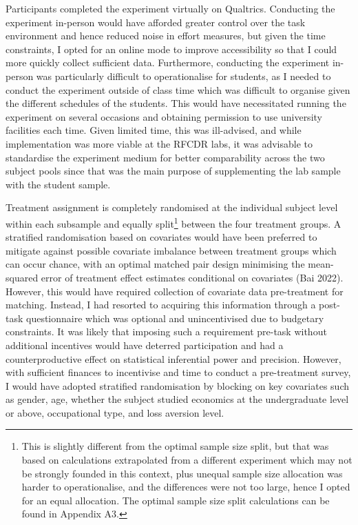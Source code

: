 \documentclass[
  12,
  letterpaper,
  DIV=11,
  numbers=noendperiod]{scrartcl}
\begin{document}
Participants completed the experiment virtually on Qualtrics. Conducting
the experiment in-person would have afforded greater control over the
task environment and hence reduced noise in effort measures, but given
the time constraints, I opted for an online mode to improve
accessibility so that I could more quickly collect sufficient data.
Furthermore, conducting the experiment in-person was particularly
difficult to operationalise for students, as I needed to conduct the
experiment outside of class time which was difficult to organise given
the different schedules of the students. This would have necessitated
running the experiment on several occasions and obtaining permission to
use university facilities each time. Given limited time, this was
ill-advised, and while implementation was more viable at the RFCDR labs,
it was advisable to standardise the experiment medium for better
comparability across the two subject pools since that was the main
purpose of supplementing the lab sample with the student sample.

Treatment assignment is completely randomised at the individual subject
level within each subsample and equally split\footnote{This is slightly
  different from the optimal sample size split, but that was based on
  calculations extrapolated from a different experiment which may not be
  strongly founded in this context, plus unequal sample size allocation
  was harder to operationalise, and the differences were not too large,
  hence I opted for an equal allocation. The optimal sample size split
  calculations can be found in Appendix A3.} between the four treatment
groups. A stratified randomisation based on covariates would have been
preferred to mitigate against possible covariate imbalance between
treatment groups which can occur chance, with an optimal matched pair
design minimising the mean-squared error of treatment effect estimates
conditional on covariates (Bai 2022). However, this would have required
collection of covariate data pre-treatment for matching. Instead, I had
resorted to acquiring this information through a post-task questionnaire
which was optional and unincentivised due to budgetary constraints. It
was likely that imposing such a requirement pre-task without additional
incentives would have deterred participation and had a counterproductive
effect on statistical inferential power and precision. However, with
sufficient finances to incentivise and time to conduct a pre-treatment
survey, I would have adopted stratified randomisation by blocking on key
covariates such as gender, age, whether the subject studied economics at
the undergraduate level or above, occupational type, and loss aversion
level.
\end{document}
